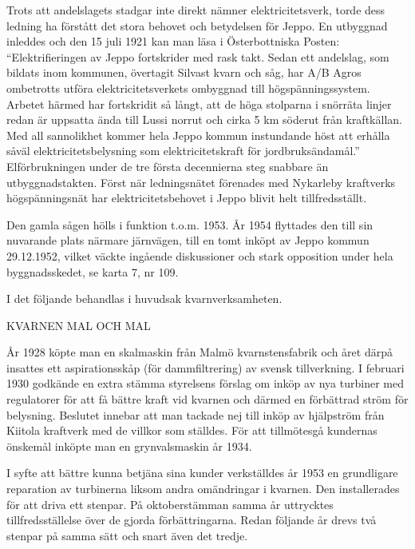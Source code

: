 Trots att andelslagets stadgar inte direkt nämner elektricitetsverk, torde dess ledning ha förstått det stora behovet och betydelsen för Jeppo. En utbyggnad inleddes och den 15 juli 1921 kan man läsa i Österbottniska Posten: ``Elektrifieringen av Jeppo fortskrider med rask takt. Sedan ett andelslag, som bildats inom kommunen, övertagit Silvast kvarn och såg, har A/B Agros ombetrotts utföra elektricitetsverkets ombyggnad till högspänningssystem. Arbetet härmed har fortskridit så långt, att de höga stolparna i snörräta linjer redan är uppsatta ända till Lussi norrut och cirka 5 km söderut från kraftkällan. Med all sannolikhet kommer hela Jeppo kommun instundande höst att erhålla såväl elektricitetsbelysning som elektricitetskraft för jordbruksändamål.''  Elförbrukningen under de tre första decennierna steg snabbare än utbyggnadstakten. Först när ledningsnätet förenades med Nykarleby kraftverks högspänningsnät har elektricitetsbehovet i Jeppo blivit helt tillfredsställt.

Den gamla sågen hölls i funktion t.o.m. 1953. År 1954 flyttades den till sin nuvarande plats närmare järnvägen, till en tomt inköpt av Jeppo kommun 29.12.1952, vilket väckte ingående diskussioner och stark opposition under hela byggnadsskedet, se karta 7, nr 109.

I det följande behandlas i huvudsak kvarnverksamheten.





KVARNEN MAL OCH MAL

År 1928 köpte man en skalmaskin från Malmö kvarnstensfabrik och året därpå insattes ett aspirationsskåp (för dammfiltrering) av svensk tillverkning. I februari 1930 godkände en extra stämma styrelsens förslag om inköp av nya turbiner med regulatorer för att få bättre kraft vid kvarnen och därmed en förbättrad ström för belysning. Beslutet innebar att man tackade nej till inköp av hjälpström från Kiitola kraftverk med de villkor som ställdes. För att tillmötesgå kundernas önskemål inköpte man en grynvalsmaskin år 1934.

I syfte att bättre kunna betjäna sina kunder verkställdes år 1953 en grundligare reparation av turbinerna liksom andra omändringar i kvarnen. Den  installerades för att driva ett stenpar. På oktoberstämman samma år uttrycktes tillfredsställelse över de gjorda förbättringarna. Redan följande år drevs två stenpar på samma sätt och snart även det tredje.


